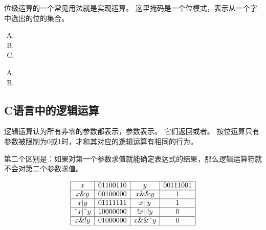 {{        位级运算的一个常见用法就是实现运算。
        这里掩码是一个位模式，表示从一个字中选出的位的集合。

        \begin{practicec}
            \begin{enumerate}[A.]
                \item {}
                \item {}
                \item {}
            \end{enumerate}
        \end{practicec}

        \begin{practicec}
            \begin{enumerate}[A.]
                \item {}
                \item {}
            \end{enumerate}
        \end{practicec}
    }

    \subsection{C语言中的逻辑运算}
    {
        逻辑运算认为所有非零的参数都表示，参数表示。
        它们返回或者。
        按位运算只有参数被限制为0或1时，才和其对应的逻辑运算有相同的行为。

        第二个区别是：如果对第一个参数求值就能确定表达式的结果，那么逻辑运算符就不会对第二个参数求值。

        \begin{practicec}
            \begin{table}[H]
                \[
                    \begin{array}{|c|c|c|c|}
                        \hline
                        x & 0110 0110 & y & 0011 1001 \\
                        \hline
                        x \&{} y & 0010 0000 & x \&{}\&{} y & 1 \\
                        \hline
                        x | y & 0111 1111 & x || y & 1 \\
                        \hline
                        \text{\~{}}x | \text{\~{}}y & 1000 0000 & !x || !y & 0 \\
                        \hline
                        x \&{} !y & 0100 0000 & x \&{}\&{} \text{\~{}}y & 0 \\
                        \hline
                    \end{array}
                \]
            \end{table}
        \end{practicec}

}}
